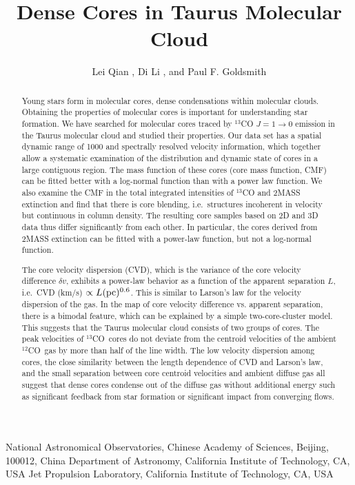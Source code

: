 \documentclass[12pt,preprint]{aastex}
\def\co{$^{12}$CO}
\def\13co{$^{13}$CO}
\begin{document}
\slugcomment{}


\title{Dense Cores in Taurus Molecular Cloud}



\author{Lei Qian , Di Li  , and  Paul F. Goldsmith }
\affil{}
 {National Astronomical Observatories, Chinese Academy of
Sciences, Beijing, 100012, China}
 {Department of Astronomy, California Institute of Technology, CA, USA}
 {Jet Propulsion Laboratory, California Institute of Technology, CA, USA}

\begin{abstract}
Young stars form in molecular cores, dense condensations
within molecular clouds. Obtaining the properties of molecular cores
is important for understanding star formation. We have searched for
molecular cores traced by $^{13}$CO $J=1\to 0$ emission in the
Taurus molecular cloud and studied their properties. Our data set
has a spatial dynamic range of 1000 and spectrally resolved velocity
information, which together allow a systematic examination of the
distribution and dynamic state of cores in a large contiguous region.
The mass function of these cores (core mass function, CMF) can be fitted better with a
log-normal function  than with a
power law function. We also examine the CMF in the total integrated
intensities of $^{13}$CO and 2MASS extinction and find that there is core blending, i.e.\  structures incoherent
in velocity but continuous in column density. The resulting core samples based on 2D and 3D data thus differ
significantly from each other. In particular, the
cores derived from 2MASS extinction can be fitted with a power-law function, but not a log-normal
function.

The core velocity dispersion (CVD), which is the variance of the core velocity difference $\delta v$,
exhibits a power-law behavior
as a function of the apparent separation $L$, i.e.\  CVD (km/s) $\propto L ({\rm pc})^{0.6}$. This is
similar to Larson's law for the velocity dispersion of the gas. In the map of core velocity difference vs. apparent separation,
 there is a bimodal
feature, which can be explained by a simple two-core-cluster model. This  suggests
that the Taurus molecular cloud consists of two groups of cores.
The peak velocities of \13co\ cores do not deviate from the centroid
velocities of the ambient \co\ gas by more than half of the line width. The low velocity dispersion among cores, the close similarity between the length dependence
of CVD and Larson's law, and the small separation between core centroid velocities and ambient diffuse gas all suggest that dense cores condense out of the diffuse gas without additional energy such as significant feedback from star formation or significant impact from converging flows.

\end{abstract}
\end{document}
